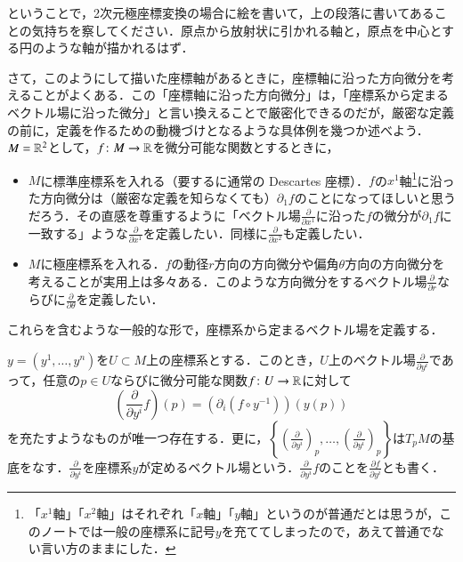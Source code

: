 \begin{que}
ということで，2次元極座標変換の場合に絵を書いて，上の段落に書いてあることの気持ちを察してください．原点から放射状に引かれる軸と，原点を中心とする円のような軸が描かれるはず．
\end{que}

さて，このようにして描いた座標軸があるときに，座標軸に沿った方向微分を考えることがよくある．この「座標軸に沿った方向微分」は，「座標系から定まるベクトル場に沿った微分」と言い換えることで厳密化できるのだが，厳密な定義の前に，定義を作るための動機づけとなるような具体例を幾つか述べよう．$M=\mathbb{R}^2$として，$f \colon M \to \mathbb{R}$を微分可能な関数とするときに，
\begin{itemize}
\item $M$に標準座標系を入れる（要するに通常の Descartes 座標）．$f$の$x^1$軸\footnote{「$x^1$軸」「$x^2$軸」はそれぞれ「$x$軸」「$y$軸」というのが普通だとは思うが，このノートでは一般の座標系に記号$y$を充ててしまったので，あえて普通でない言い方のままにした．}に沿った方向微分は（厳密な定義を知らなくても）$\partial_1 f$のことになってほしいと思うだろう．その直感を尊重するように「ベクトル場$\frac{\partial}{\partial x^1}$に沿った$f$の微分が$\partial_1 f$に一致する」ような$\frac{\partial}{\partial x^1}$を定義したい．同様に$\frac{\partial}{\partial x^2}$も定義したい．
\item $M$に極座標系を入れる．$f$の動径$r$方向の方向微分や偏角$\theta$方向の方向微分を考えることが実用上は多々ある．このような方向微分をするベクトル場$\frac{\partial}{\partial r}$ならびに$\frac{\partial}{\partial \theta}$を定義したい．
\end{itemize}

これらを含むような一般的な形で，座標系から定まるベクトル場を定義する．
\begin{prop}\label{Euclid空間での座標系から定まるベクトル場}
$y=(y^1, \dots, y^n)$を$U \subset M$上の座標系とする．このとき，$U$上のベクトル場$\frac{\partial}{\partial y^i}$であって，任意の$p \in U$ならびに微分可能な関数$f \colon U \to \mathbb{R}$に対して
\begin{equation}
\left( \frac{\partial}{\partial y^i} f \right)(p) = \left(\partial_i (f \circ y^{-1}) \right) (y(p))
\end{equation}を充たすようなものが唯一つ存在する．更に，$\left\{ \left(\frac{\partial}{\partial y^i}\right)_p,\dots, \left(\frac{\partial}{\partial y^i}\right)_p \right\}$は$T_pM$の基底をなす．$\frac{\partial}{\partial y^i}$を座標系$y$が定めるベクトル場という．$\frac{\partial}{\partial y^i} f$のことを$\frac{\partial f}{\partial y^i}$とも書く．
\end{prop}

